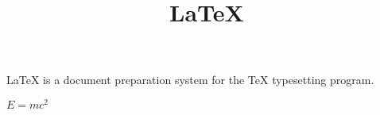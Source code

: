 \documentclass[14pt]{article}
\title{\LaTeX}
\date{}
\begin{document}
  \maketitle 
  \LaTeX{} is a document preparation system 
  for the \TeX{} typesetting program.
 \par 
 $E=mc^2$
\end{document}
